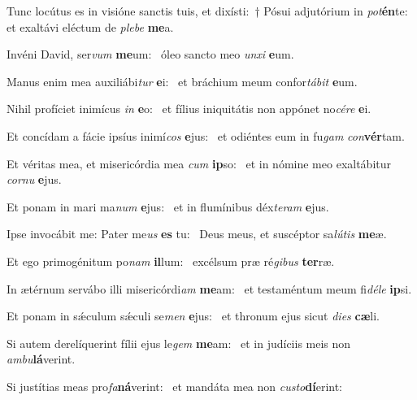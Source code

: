 \item Tunc locútus es in visióne sanctis tuis, et dixísti:~† Pósui adjutórium in \textit{pot}\textbf{én}te:~\psstar{} et exaltávi eléctum de \textit{plebe} \textbf{me}a.

\item Invéni David, ser\textit{vum} \textbf{me}um:~\psstar{} óleo sancto meo \textit{unxi} \textbf{e}um.

\item Manus enim mea auxiliábi\textit{tur} \textbf{e}i:~\psstar{} et bráchium meum confor\textit{tábit} \textbf{e}um.

\item Nihil profíciet inimícus \textit{in} \textbf{e}o:~\psstar{} et fílius iniquitátis non appónet no\textit{cére} \textbf{e}i.

\item Et concídam a fácie ipsíus inimí\textit{cos} \textbf{e}jus:~\psstar{} et odiéntes eum in fu\textit{gam} \textit{con}\textbf{vér}tam.

\item Et véritas mea, et misericórdia mea \textit{cum} \textbf{ip}so:~\psstar{} et in nómine meo exaltábitur \textit{cornu} \textbf{e}jus.

\item Et ponam in mari ma\textit{num} \textbf{e}jus:~\psstar{} et in flumínibus déx\textit{teram} \textbf{e}jus.

\item Ipse invocábit me: Pater me\textit{us} \textbf{es} tu:~\psstar{} Deus meus, et suscéptor sa\textit{lútis} \textbf{me}æ.

\item Et ego primogénitum po\textit{nam} \textbf{il}lum:~\psstar{} excélsum præ ré\textit{gibus} \textbf{ter}ræ.

\item In ætérnum servábo illi misericórdi\textit{am} \textbf{me}am:~\psstar{} et testaméntum meum fi\textit{déle} \textbf{ip}si.

\item Et ponam in sǽculum sǽculi se\textit{men} \textbf{e}jus:~\psstar{} et thronum ejus sicut \textit{dies} \textbf{cæ}li.

\item Si autem derelíquerint fílii ejus le\textit{gem} \textbf{me}am:~\psstar{} et in judíciis meis non \textit{ambu}\textbf{lá}verint.

\item Si justítias meas pro\textit{fa}\textbf{ná}verint:~\psstar{} et mandáta mea non \textit{custo}\textbf{dí}erint:

